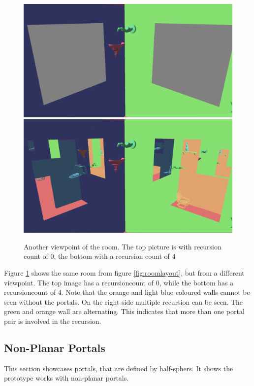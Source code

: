 \begin{figure}[H]
	\includegraphics[width=\linewidth]{images/roomportalsr0.png}
	\includegraphics[width=\linewidth]{images/roomportals.png}
	\caption{Another viewpoint of the room. The top picture is with recursion count of 0, the bottom with a recursion count of 4}
	\label{fig:room}
\end{figure}


Figure \ref{fig:room} shows the same room from figure \ref{fig:roomlayout}, but from a different viewpoint. The top image has a \gls{recursioncount} of 0, while the bottom has a \gls{recursioncount} of 4. Note that the orange and light blue coloured walls cannot be seen without the portals. On the right side multiple recursion can be seen. The green and orange wall are alternating. This indicates that more than one portal pair is involved in the recursion.

\subsection{Non-Planar Portals}
\label{section:nonplanar}

This section showcases portals, that are defined by half-sphers. It shows the prototype works with non-planar portals.

